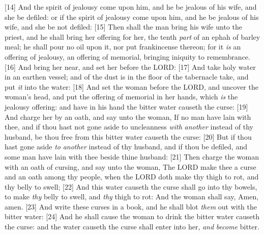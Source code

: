 [14] \textcolor[cmyk]{0.99998,1,0,0}{And the spirit of jealousy come upon him, and he be jealous of his wife, and she be defiled: or if the spirit of jealousy come upon him, and he be jealous of his wife, and she be not defiled:}
[15] \textcolor[cmyk]{0.99998,1,0,0}{Then shall the man bring his wife unto the priest, and he shall bring her offering for her, the tenth \emph{part} of an ephah of barley meal; he shall pour no oil upon it, nor put frankincense thereon; for it \emph{is} an offering of jealousy, an offering of memorial, bringing iniquity to remembrance.}
[16] \textcolor[cmyk]{0.99998,1,0,0}{And   bring her near, and set her before the LORD:}
[17] \textcolor[cmyk]{0.99998,1,0,0}{And   take holy water in an earthen vessel; and of the dust  is in the floor of the tabernacle   take, and put \emph{it} into the water:}
[18] \textcolor[cmyk]{0.99998,1,0,0}{And   set the woman before the LORD, and uncover the woman's head, and put the offering of memorial in her hands, which \emph{is} the jealousy offering: and   have in his hand the bitter water  causeth the curse:}
[19] \textcolor[cmyk]{0.99998,1,0,0}{And   charge her by an oath, and say unto the woman, If no man have lain with thee, and if thou hast not gone aside to uncleanness \emph{with} \emph{another} instead of thy husband, be thou free from this bitter water  causeth the curse:}
[20] \textcolor[cmyk]{0.99998,1,0,0}{But if thou hast gone aside \emph{to} \emph{another} instead of thy husband, and if thou be defiled, and some man have lain with thee beside thine husband:}
[21] \textcolor[cmyk]{0.99998,1,0,0}{Then   charge the woman with an oath of cursing, and   say unto the woman, The LORD make thee a curse and an oath among thy people, when the LORD doth make thy thigh to rot, and thy belly to swell;}
[22] \textcolor[cmyk]{0.99998,1,0,0}{And this water  causeth the curse shall go into thy bowels, to make \emph{thy} belly to swell, and \emph{thy} thigh to rot: And the woman shall say, Amen, amen.}
[23] \textcolor[cmyk]{0.99998,1,0,0}{And   write these curses in a book, and he shall blot \emph{them} out with the bitter water:}
[24] \textcolor[cmyk]{0.99998,1,0,0}{And he shall cause the woman to drink the bitter water  causeth the curse: and the water  causeth the curse shall enter into her, \emph{and} \emph{become} bitter.}
